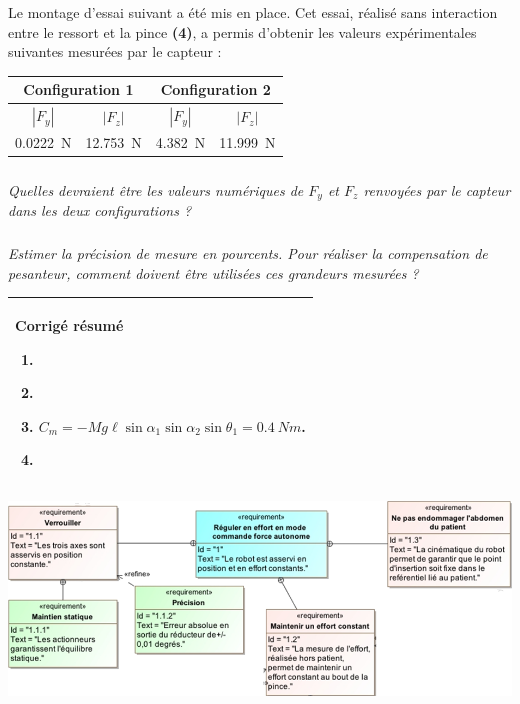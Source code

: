 \documentclass[10pt,fleqn]{article} %
\begin{document}
\begin{multicols}{2}
Le montage d’essai suivant a été mis en place. Cet essai, réalisé sans interaction entre le ressort et la pince \textbf{(4)}, a permis d’obtenir les valeurs expérimentales suivantes mesurées par le
capteur :
\begin{center}
\begin{tabular}{|c|c|c|c|}
\hline
\multicolumn{2}{|c|}{Configuration 1}&\multicolumn{2}{c|}{Configuration 2}\\ \hline
$|F_y|$ & $|F_z|$ & $|F_y|$ & $|F_z|$ \\ \hline
\SI{0,0222}{N} & \SI{12,753}{N} & \SI{4,382}{N} & \SI{11,999}{N} \\ \hline
\end{tabular}
\end{center}

\subparagraph{}
\textit{Quelles devraient être les valeurs numériques de $F_y$ et $F_z$ renvoyées par le capteur dans les deux configurations ?}

\subparagraph{}
\textit{Estimer la précision de mesure en pourcents. Pour réaliser la compensation de pesanteur, comment doivent être utilisées ces grandeurs mesurées ?}


\ifprof
\else
\begin{center}
\begin{tabular}{|p{.95\linewidth}|}
\hline
\textbf{Corrigé résumé}
\begin{enumerate}
\item $\quad$
\item $\quad$
\item $C_m=-Mg\ell\sin\alpha_1\sin\alpha_2\sin\theta_1 =\SI{0,4}{Nm}$.
\item $\quad$
\end{enumerate} \\
\hline
\end{tabular}
\end{center}
\fi
\ifprof
\else
\end{multicols}
\fi

\ifprof
\else

\vspace{1cm}
\begin{center}
\includegraphics[width=\linewidth]{images/fig_03}
\end{center}
\fi
\end{document}
